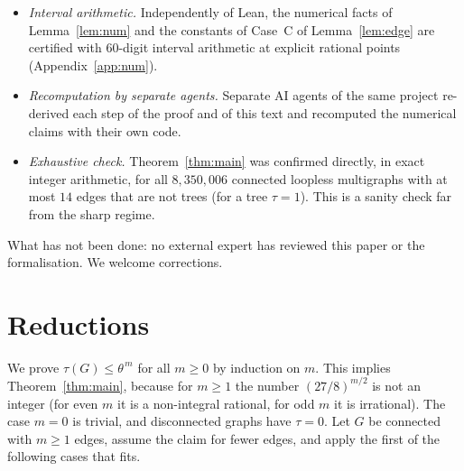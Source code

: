 \documentclass[11pt]{amsart}
\theoremstyle{plain}
\theoremstyle{remark}
\newcommand{\code}[1]{\texttt{#1}}
\newcommand{\rb}{\bar r}
\newcommand{\tht}{\theta}
\begin{document}
\begin{itemize}
  $h^{(t)}$ with $h^{(0)}=0$ that satisfy the inequality stated after \eqref{eq:h}, then
  $\sum_v\log\bigl(d_v-\sum_{u\sim v}h_{u\to v}\bigr)-\sum_e\log(1-q_e)\le m\cdot\frac12\log\frac{27}{8}$; the left
  side equals $\sum_e\log(1+r_e)-\sum_v\log x_v$. This covers the bounds of Lemma~\ref{lem:apriori}, the
  identities \eqref{eq:I}, the bounds on $\rb_v$ in Lemma~\ref{lem:ranges}, Lemma~\ref{lem:onevar} and the
  inequality $E_e\le L$ of Lemma~\ref{lem:edge}. In place of the decimal values of Lemma~\ref{lem:num} and of
  Case~C, Lean uses exact inequalities between natural numbers for degrees $2$ to $119$, evaluated by its kernel,
  and a direct estimate for larger degrees. The proof contains no \code{sorry} and uses only the three standard
  axioms of Lean and Mathlib, and an explicit example shows that equality can occur.
  This package is kept unchanged from version~1; its eight modules are used, without change, by the formal
  proof of Theorem~\ref{thm:main}. In version~1 this was the only formalised part, and
  Theorem~\ref{thm:main} itself was not machine-checked.
\item \emph{Interval arithmetic.} Independently of Lean, the numerical facts of Lemma~\ref{lem:num} and the
  constants of Case~C of Lemma~\ref{lem:edge} are certified with $60$-digit interval arithmetic at explicit rational
  points (Appendix~\ref{app:num}).
\item \emph{Recomputation by separate agents.} Separate AI agents of the same project re-derived each step of the
  proof and of this text and recomputed the numerical claims with their own code.
\item \emph{Exhaustive check.} Theorem~\ref{thm:main} was confirmed directly, in exact integer arithmetic, for all
  $8{,}350{,}006$ connected loopless multigraphs with at most $14$ edges that are not trees (for a tree $\tau=1$).
  This is a sanity check far from the sharp regime.
\end{itemize}
What has not been done: no external expert has reviewed this paper or the formalisation. We welcome corrections.

\section{Reductions}\label{sec:red}

We prove $\tau(G)\le\tht^{\,m}$ for all $m\ge0$ by induction on $m$. This implies Theorem~\ref{thm:main}, because
for $m\ge1$ the number $(27/8)^{m/2}$ is not an integer (for even $m$ it is a non-integral rational, for odd $m$
it is irrational). The case $m=0$ is trivial, and disconnected graphs have $\tau=0$. Let $G$ be connected with
$m\ge1$ edges, assume the claim for fewer edges, and apply the first of the following cases that fits.
\end{document}
